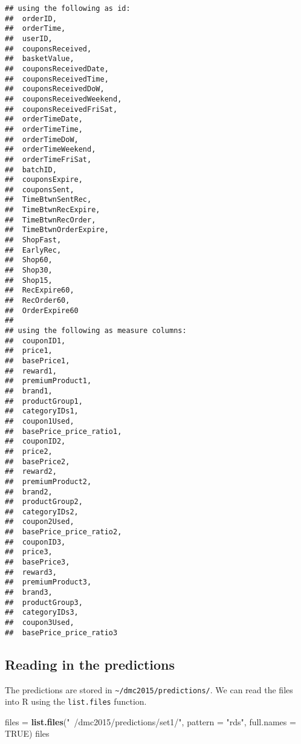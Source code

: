 \documentclass[10pt]{report}
\newenvironment{Shaded}{}{}
\newcommand{\KeywordTok}[1]{\textcolor[rgb]{0.00,0.44,0.13}{\textbf{{#1}}}}
\newcommand{\DataTypeTok}[1]{\textcolor[rgb]{0.56,0.13,0.00}{{#1}}}
\newcommand{\StringTok}[1]{\textcolor[rgb]{0.25,0.44,0.63}{{#1}}}
\newcommand{\OtherTok}[1]{\textcolor[rgb]{0.00,0.44,0.13}{{#1}}}
\newcommand{\NormalTok}[1]{{#1}}
\begin{document}
\begin{verbatim}
## using the following as id:
##  orderID,
##  orderTime,
##  userID,
##  couponsReceived,
##  basketValue,
##  couponsReceivedDate,
##  couponsReceivedTime,
##  couponsReceivedDoW,
##  couponsReceivedWeekend,
##  couponsReceivedFriSat,
##  orderTimeDate,
##  orderTimeTime,
##  orderTimeDoW,
##  orderTimeWeekend,
##  orderTimeFriSat,
##  batchID,
##  couponsExpire,
##  couponsSent,
##  TimeBtwnSentRec,
##  TimeBtwnRecExpire,
##  TimeBtwnRecOrder,
##  TimeBtwnOrderExpire,
##  ShopFast,
##  EarlyRec,
##  Shop60,
##  Shop30,
##  Shop15,
##  RecExpire60,
##  RecOrder60,
##  OrderExpire60
## 
## using the following as measure columns:
##  couponID1,
##  price1,
##  basePrice1,
##  reward1,
##  premiumProduct1,
##  brand1,
##  productGroup1,
##  categoryIDs1,
##  coupon1Used,
##  basePrice_price_ratio1,
##  couponID2,
##  price2,
##  basePrice2,
##  reward2,
##  premiumProduct2,
##  brand2,
##  productGroup2,
##  categoryIDs2,
##  coupon2Used,
##  basePrice_price_ratio2,
##  couponID3,
##  price3,
##  basePrice3,
##  reward3,
##  premiumProduct3,
##  brand3,
##  productGroup3,
##  categoryIDs3,
##  coupon3Used,
##  basePrice_price_ratio3
\end{verbatim}

\begin{Shaded}
\end{Shaded}

\subsection{Reading in the
predictions}\label{reading-in-the-predictions}

The predictions are stored in \verb!~/dmc2015/predictions/!. We can read
the files into R using the \verb!list.files! function.

\begin{Shaded}
\begin{Highlighting}[]
\NormalTok{files =}\StringTok{ }\KeywordTok{list.files}\NormalTok{(}\StringTok{"~/dmc2015/predictions/set1/"}\NormalTok{, }\DataTypeTok{pattern =} \StringTok{"rds"}\NormalTok{, }\DataTypeTok{full.names =} \OtherTok{TRUE}\NormalTok{)}
\NormalTok{files}
\end{Highlighting}
\end{Shaded}
\end{document}
